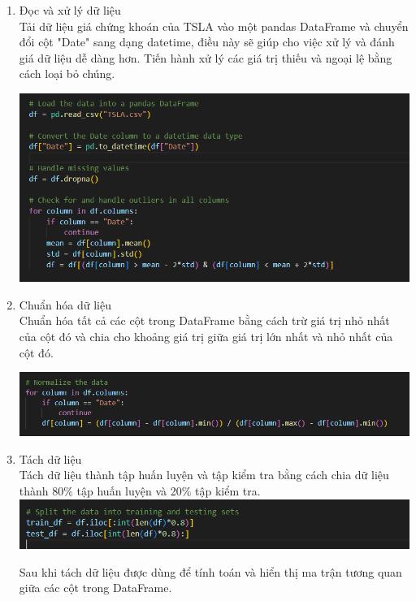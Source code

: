 \documentclass[12pt,a4paper]{article}
\begin{document}
	\begin{enumerate}
		\item Đọc và xử lý dữ liệu \\
		
		Tải dữ liệu giá chứng khoán của TSLA vào một pandas DataFrame và chuyển đổi cột "Date" sang dạng datetime, điều này sẽ giúp cho việc xử lý và đánh giá dữ liệu dễ dàng hơn. Tiến hành xử lý các giá trị thiếu và ngoại lệ bằng cách loại bỏ chúng.
		
		\includegraphics{1}
		
		\item Chuẩn hóa dữ liệu \\ 
		
		Chuẩn hóa tất cả các cột trong DataFrame bằng cách trừ giá trị nhỏ nhất của cột đó và chia cho khoảng giá trị giữa giá trị lớn nhất và nhỏ nhất của cột đó.
		
		\includegraphics{2}
		
		\item Tách dữ liệu \\ 
		
		Tách dữ liệu thành tập huấn luyện và tập kiểm tra bằng cách chia dữ liệu thành 80\% tập huấn luyện và 20\% tập kiểm tra. \\
		
		\includegraphics{3}
		
		Sau khi tách dữ liệu được dùng để tính toán và hiển thị ma trận tương quan giữa các cột trong DataFrame. 
		

\end{enumerate}
\end{document}
